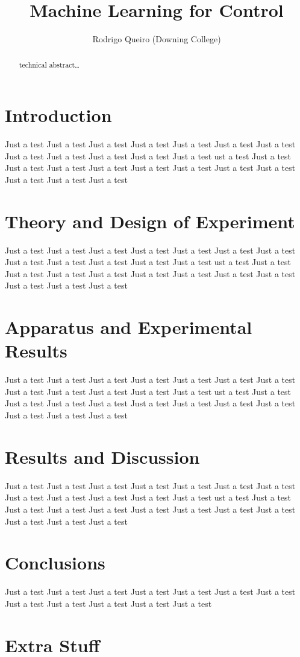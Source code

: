 \documentclass{IIBproject}
\begin{document}
\author{Rodrigo Queiro (Downing College)}
\title{Machine Learning for Control}
\maketitle
\thispagestyle{empty}

\renewcommand{\abstractname}{Technical Abstract}
\begin{abstract}
  technical abstract\ldots
\end{abstract}
\pagestyle{plain}
\tableofcontents
\newpage

\section{Introduction}
Just a test Just a test Just a test Just a test Just a test Just a test 
Just a test Just a test Just a test Just a test Just a test Just a test 
ust a test Just a test Just a test Just a test Just a test Just a test 
Just a test Just a test Just a test Just a test Just a test Just a test 

\section{Theory and Design of Experiment}
Just a test Just a test Just a test Just a test Just a test Just a test 
Just a test Just a test Just a test Just a test Just a test Just a test 
ust a test Just a test Just a test Just a test Just a test Just a test 
Just a test Just a test Just a test Just a test Just a test Just a test 

\section{Apparatus and Experimental Results}
Just a test Just a test Just a test Just a test Just a test Just a test 
Just a test Just a test Just a test Just a test Just a test Just a test 
ust a test Just a test Just a test Just a test Just a test Just a test 
Just a test Just a test Just a test Just a test Just a test Just a test 

\section{Results and Discussion}
Just a test Just a test Just a test Just a test Just a test Just a test 
Just a test Just a test Just a test Just a test Just a test Just a test 
ust a test Just a test Just a test Just a test Just a test Just a test 
Just a test Just a test Just a test Just a test Just a test Just a test 

\section{Conclusions}
Just a test Just a test Just a test Just a test Just a test Just a test 
Just a test Just a test Just a test Just a test Just a test Just a test 

% 


\pagebreak
\appendix

\section{Extra Stuff}
\end{document}
